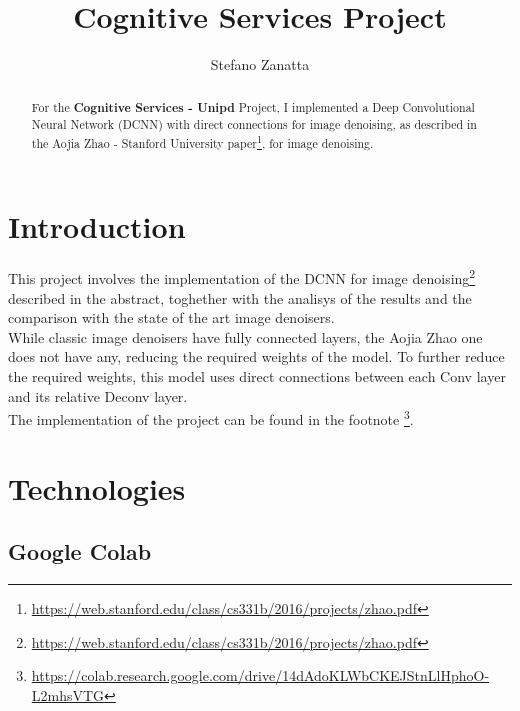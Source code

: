 \documentclass[twocolumn,showpacs,%
  nofootinbib,aps,superscriptaddress,%
  eqsecnum,prd,notitlepage,showkeys,10pt]{revtex4-1}
\begin{document}
\title{Cognitive Services Project}
\author{Stefano Zanatta}

\begin{abstract}
For the \textbf{Cognitive Services - Unipd} Project, I implemented a Deep Convolutional Neural Network (DCNN) with direct connections for image denoising, as described in the Aojia Zhao - Stanford University paper\footnote{\url{https://web.stanford.edu/class/cs331b/2016/projects/zhao.pdf}}, for image denoising.
\end{abstract}

\maketitle

\section{Introduction}
\label{sec:introduction}
This project involves the implementation of the DCNN for image denoising\footnote{\url{https://web.stanford.edu/class/cs331b/2016/projects/zhao.pdf}} described in the abstract, toghether with the analisys of the results and the comparison with the state of the art image denoisers.\\
While classic image denoisers have fully connected layers, the Aojia Zhao one does not have any, reducing the required weights of the model. To further reduce the required weights, this model uses direct connections between each Conv layer and its relative Deconv layer.\\
The implementation of the project can be found in the footnote \footnote{\url{https://colab.research.google.com/drive/14dAdoKLWbCKEJStnLlHphoO-L2mhsVTG}}.

\section{Technologies}
\label{sec:technologies}

\subsection{Google Colab}
\label{subsec:colab}
\end{document}
